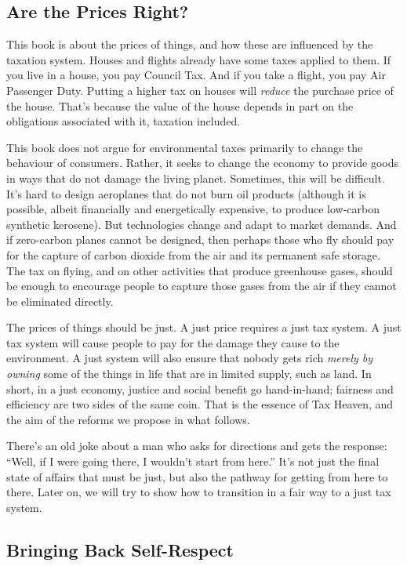 \documentclass[]{tufte-handout}
\begin{document}
\hypertarget{are-the-prices-right}{%
\subsection{Are the Prices Right?}\label{are-the-prices-right}}

This book is about the prices of things, and how these are influenced by
the taxation system. Houses and flights already have some taxes applied
to them. If you live in a house, you pay Council Tax. And if you take a
flight, you pay Air Passenger Duty. Putting a higher tax on houses will
\emph{reduce} the purchase price of the house. That's because the value
of the house depends in part on the obligations associated with it,
taxation included.

This book does not argue for environmental taxes primarily to change the
behaviour of consumers. Rather, it seeks to change the economy to
provide goods in ways that do not damage the living planet. Sometimes,
this will be difficult. It's hard to design aeroplanes that do not burn
oil products (although it is possible, albeit financially and
energetically expensive, to produce low-carbon synthetic kerosene). But
technologies change and adapt to market demands. And if zero-carbon
planes cannot be designed, then perhaps those who fly should pay for the
capture of carbon dioxide from the air and its permanent safe storage.
The tax on flying, and on other activities that produce greenhouse
gases, should be enough to encourage people to capture those gases from
the air if they cannot be eliminated directly.

The prices of things should be just. A just price requires a just tax
system. A just tax system will cause people to pay for the damage they
cause to the environment. A just system will also ensure that nobody
gets rich \emph{merely by owning} some of the things in life that are in
limited supply, such as land. In short, in a just economy, justice and
social benefit go hand-in-hand; fairness and efficiency are two sides of
the same coin. That is the essence of Tax Heaven, and the aim of the
reforms we propose in what follows.

There's an old joke about a man who asks for directions and gets the
response: ``Well, if I were going there, I wouldn't start from here.''
It's not just the final state of affairs that must be just, but also the
pathway for getting from here to there. Later on, we will try to show
how to transition in a fair way to a just tax system.

\hypertarget{bringing-back-self-respect}{%
\subsection{Bringing Back
Self-Respect}\label{bringing-back-self-respect}}
\end{document}
